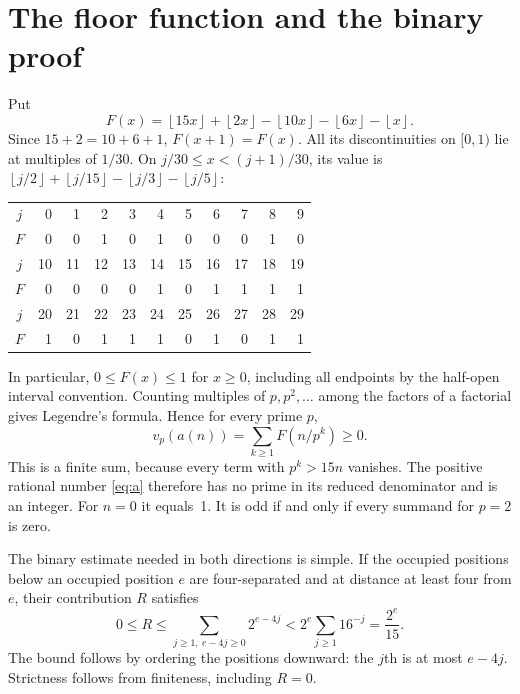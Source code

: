 \documentclass[11pt]{article}
\newcommand{\fl}[1]{\left\lfloor #1\right\rfloor}
\begin{document}
\section{The floor function and the binary proof}
Put
\begin{equation}\label{eq:F}
 F(x)=\fl{15x}+\fl{2x}-\fl{10x}-\fl{6x}-\fl{x}.
\end{equation}
Since $15+2=10+6+1$, $F(x+1)=F(x)$. All its discontinuities
on $[0,1)$ lie at multiples of $1/30$. On
$j/30\leq x<(j+1)/30$, its value is
$\fl{j/2}+\fl{j/15}-\fl{j/3}-\fl{j/5}$:
\begin{center}
\begin{tabular}{c|rrrrrrrrrr}
\toprule
$j$&0&1&2&3&4&5&6&7&8&9\\
$F$&0&0&1&0&1&0&0&0&1&0\\
\midrule
$j$&10&11&12&13&14&15&16&17&18&19\\
$F$&0&0&0&0&1&0&1&1&1&1\\
\midrule
$j$&20&21&22&23&24&25&26&27&28&29\\
$F$&1&0&1&1&1&0&1&0&1&1\\
\bottomrule
\end{tabular}
\end{center}
In particular, $0\leq F(x)\leq1$ for $x\geq0$, including all
endpoints by the half-open interval convention.
Counting multiples of $p,p^2,\ldots$ among the factors of a factorial gives
Legendre's formula. Hence for every prime $p$,
\begin{equation}\label{eq:valuation}
 v_p(a(n))=\sum_{k\geq1}F(n/p^k)\geq0.
\end{equation}
This is a finite sum, because every term with $p^k>15n$ vanishes.
The positive rational number \eqref{eq:a} therefore has no prime in its
reduced denominator and is an integer. For $n=0$ it equals~1.
It is odd if and only if every summand for $p=2$ is zero.

The binary estimate needed in both directions is simple. If the occupied
positions below an occupied position $e$ are four-separated and at distance
at least four from $e$, their contribution $R$ satisfies
\begin{equation}\label{eq:tail}
 0\leq R\leq\sum_{j\geq1,\ e-4j\geq0}2^{e-4j}
       <2^e\sum_{j\geq1}16^{-j}=\frac{2^e}{15}.
\end{equation}
The bound follows by ordering the positions downward: the $j$th is
at most $e-4j$. Strictness follows from finiteness, including $R=0$.
\end{document}
